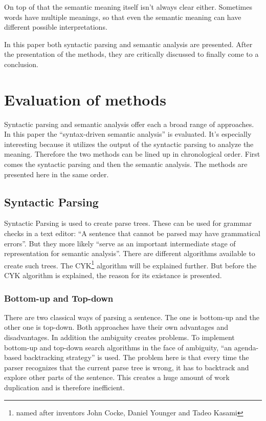 \documentclass[12pt,twoside]{scrartcl}
\theoremstyle{plain}
\theoremstyle{definition}
\theoremstyle{remark}
\begin{document}
	On top of that the semantic meaning itself isn't always clear either. Sometimes words have multiple meanings, so that even the semantic meaning can have different possible interpretations.
	
	In this paper both syntactic parsing and semantic analysis are presented. After the presentation of the methods, they are critically discussed to finally come to a conclusion.

\section{Evaluation of methods}
\label{sec:evalMethods}
	
	
	Syntactic parsing and semantic analysis offer each a broad range of approaches. In this paper the ``syntax-driven semantic analysis''\cite[p.~617]{Jurafsky2009} is evaluated. It's especially interesting because it utilizes the output of the syntactic parsing to analyze the meaning. Therefore the two methods can be lined up in chronological order. First comes the syntactic parsing and then the semantic analysis. The methods are presented here in the same order. 
	
	\subsection{Syntactic Parsing}
	\label{subSec:syntacticParsing}
		Syntactic Parsing is used to create parse trees. These can be used for grammar checks in a text editor: ``A sentence that cannot be parsed may have grammatical errors''\cite[p.~461]{Jurafsky2009b}. But they more likely ``serve as an important intermediate stage of representation for semantic analysis''\cite[p.~461]{Jurafsky2009b}. There are different algorithms available to create such trees. The CYK\footnote{named after inventors John Cocke, Daniel Younger and Tadeo Kasami} algorithm will be explained further. But before the CYK algorithm is explained, the reason for its existance is presented.
		
		\subsubsection*{Bottom-up and Top-down}
		\label{subSubSec:bottomUpTopDown}
		
		There are two classical ways of parsing a sentence. The one is bottom-up and the other one is top-down. Both approaches have their own advantages and disadvantages. In addition the ambiguity creates problems. To implement bottom-up and top-down search algorithms in the face of ambiguity, ``an agenda-based backtracking strategy''\cite[p.~468]{Jurafsky2009b} is used. The problem here is that every time the parser recognizes that the current parse tree is wrong, it has to backtrack and explore other parts of the sentence. This creates a huge amount of work duplication and is therefore inefficient.
		
\end{document}

